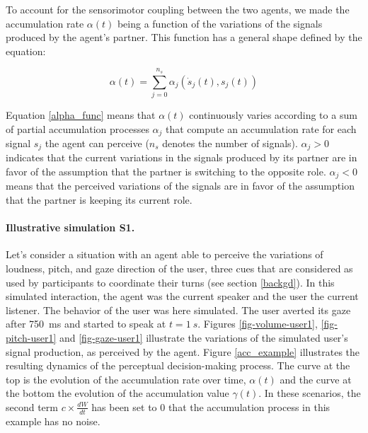 To account for the sensorimotor coupling between the two agents, we made the accumulation rate $\alpha(t)$ being a function of the variations of the signals produced by the agent's partner. This function has a general shape defined by the equation: 

\begin{equation}
  \alpha(t) = \sum_{j=0}^{n_{s}} \alpha_{j}(\dot{s}_j(t),s_j(t))
  \label{alpha_func}
\end{equation}

Equation \ref{alpha_func} means that $\alpha(t)$ continuously varies according to a sum of partial accumulation processes $\alpha_{j}$ that compute an accumulation rate for each signal $s_j$ the agent can perceive ($n_s$ denotes the number of signals). %
$\alpha_{j}>0$ indicates that the current variations in the signals produced by its partner are in favor of the assumption that the partner is switching to  the opposite role.
$\alpha_{j}<0$  means that the perceived variations of the signals are in favor of the assumption that the partner is keeping its current role. 

\paragraph{Illustrative simulation S1.}%
Let's consider a situation with an agent able to perceive the variations of loudness, pitch, and gaze direction of the user, three cues that are considered as used by participants to coordinate their turns (see section \ref{backgd}). 
In this simulated interaction, the agent was the current speaker and the user the current listener. The behavior of the user was here simulated.
The user averted its gaze after 750~ms and started to speak at $t=1~s$. %
Figures \ref{fig-volume-user1}, \ref{fig-pitch-user1} and \ref{fig-gaze-user1} illustrate the variations of the simulated user's signal production, as perceived by the agent. 
Figure \ref{acc_example} illustrates the resulting dynamics of the perceptual decision-making process. 
The curve at the top is the evolution of the accumulation rate over time, $\alpha(t)$ and the curve at the bottom the evolution of the accumulation value $\gamma(t)$. In these scenarios, the second term $c \times \frac{dW}{dt}$ has been set to 0 that the accumulation process in this example has no noise. 

